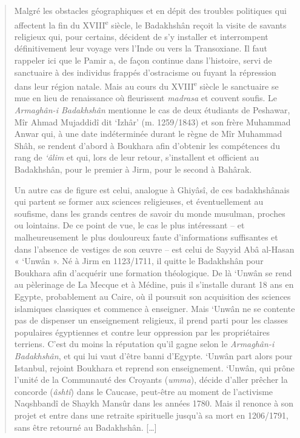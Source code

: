 \begin{quote}
Malgré les obstacles géographiques et en dépit des troubles politiques
qui affectent la fin du XVIII\textsuperscript{e} siècle, le Badakhshân
reçoit la visite de savants religieux qui, pour certains, décident de
s'y installer et interrompent définitivement leur voyage vers l'Inde ou
vers la Transoxiane. Il faut rappeler ici que le Pamir a, de façon
continue dans l'histoire, servi de sanctuaire à des individus frappés
d'ostracisme ou fuyant la répression dans leur région natale. Mais au cours du
XVIII\textsuperscript{e} siècle le sanctuaire se mue en lieu de
renaissance où fleurissent \emph{madrasa} et couvent soufis. Le
\emph{Armaghân-i Badakhshân} mentionne le cas de deux étudiants de
Peshawar, Mîr Ahmad Mujaddidî dit `Izhâr' (m. 1259/1843) et son frère
Muhammad Anwar qui, à une date indéterminée durant le règne de Mîr
Muhammad Shâh, se rendent d'abord à Boukhara afin d'obtenir les
compétences du rang de \emph{`âlim} et qui, lors de leur retour,
s'installent et officient au Badakhshân, pour le premier à Jirm, pour le
second à Bahârak.

Un autre cas de figure est celui, analogue à Ghiyâsî, de ces
badakhshânais qui partent se former aux sciences religieuses, et
éventuellement au soufisme, dans les grands centres de savoir du monde
musulman, proches ou lointains. De ce point de vue, le cas le plus
intéressant -- et malheureusement le plus douloureux faute
d'informations suffisantes et dans l'absence de vestiges de son œuvre --
est celui de Sayyid Abâ al-Hasan « `Unwân ». Né à Jirm en 1123/1711, il
quitte le Badakhshân pour Boukhara afin d'acquérir une formation
théologique. De là `Unwân se rend au pèlerinage de La Mecque et à
Médine, puis il s'installe durant 18 ans en Egypte, probablement au
Caire, où il poursuit son acquisition des sciences islamiques classiques
et commence à enseigner. Mais `Unwân ne se contente pas de dispenser un
enseignement religieux, il prend parti pour les classes populaires
égyptiennes et contre leur oppression par les propriétaires terriens.
C'est du moins la réputation qu'il gagne selon le \emph{Armaghân-i
Badakhshân}, et qui lui vaut d'être banni d'Egypte. `Unwân part alors
pour Istanbul, rejoint Boukhara et reprend son enseignement. `Unwân, qui
prône l'unité de la Communauté des Croyants (\emph{umma}), décide
d'aller prêcher la concorde (\emph{âshtî}) dans le Caucase, peut-être au
moment de l'activisme Naqshbandî de Shaykh Mansûr dans les années 1780.
Mais il renonce à son projet et entre dans une retraite spirituelle
jusqu'à sa mort en 1206/1791, sans être retourné au Badakhshân.
{[}\ldots{]}

\end{quote}

